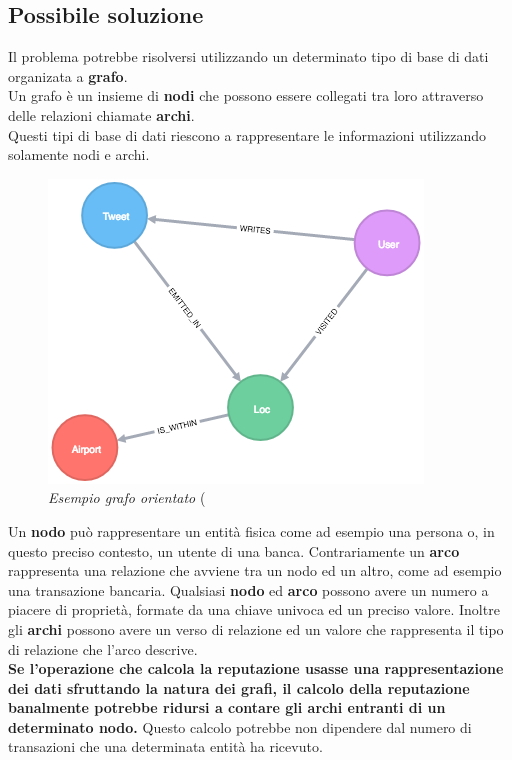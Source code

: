 \subsection{Possibile soluzione}
Il problema potrebbe risolversi utilizzando un determinato tipo di base di dati organizata a \textbf{grafo}.\\
Un grafo è un insieme di \textbf{nodi} che possono essere collegati tra loro attraverso delle relazioni chiamate \textbf{archi}.\\
Questi tipi di base di dati riescono a rappresentare le informazioni utilizzando solamente nodi e archi.
\newpage
\begin{figure}[h!]
	\centering
	\includegraphics[scale=0.7]{immagini/grafo.png}
	\caption{\textit{Esempio grafo orientato} (}
\end{figure}
Un \textbf{nodo} può rappresentare un entità fisica come ad esempio una persona o, in questo preciso contesto, un utente di una banca. Contrariamente un \textbf{arco} rappresenta una relazione che avviene tra un nodo ed un altro, come ad esempio una transazione bancaria. Qualsiasi \textbf{nodo} ed \textbf{arco} possono avere un numero a piacere di proprietà, formate da una chiave univoca ed un preciso valore. Inoltre gli \textbf{archi} possono avere un verso di relazione ed un valore che rappresenta il tipo di relazione che l'arco descrive.\\
\textbf{Se l'operazione che calcola la reputazione usasse una rappresentazione dei dati sfruttando la natura dei grafi, il calcolo della reputazione banalmente potrebbe ridursi a contare gli archi entranti di un determinato nodo.} Questo calcolo potrebbe non dipendere dal numero di transazioni che una determinata entità ha ricevuto.\\
